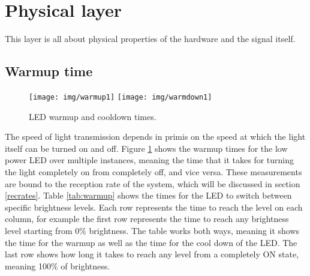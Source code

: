 \section{Physical layer}
\label{physical}
This layer is all about physical properties of the hardware and the signal itself.\\


\subsection{Warmup time}

\begin{figure}[h]
\centering
\texttt{[image: img/warmup1]}
\texttt{[image: img/warmdown1]}
\caption{LED warmup and cooldown times.}
\label{fig:warmup}
\end{figure}

The speed of light transmission depends in primis on the speed at which the light itself can be turned on and off.
Figure \ref{fig:warmup} shows the warmup times for the low power LED over multiple instances, meaning the time that it takes for turning the light completely on from completely off, and vice versa.
These measurements are bound to the reception rate of the system, which will be discussed in section \ref{recrates}.
Table \ref{tab:warmup} shows the times for the LED to switch between specific brightness levels.
Each row represents the time to reach the level on each column, for example the first row represents the time to reach any brightness level starting from 0\% brightness.
The table works both ways, meaning it shows the time for the warmup as well as the time for the cool down of the LED.
The last row shows how long it takes to reach any level from a completely ON state, meaning 100\% of brightness.

